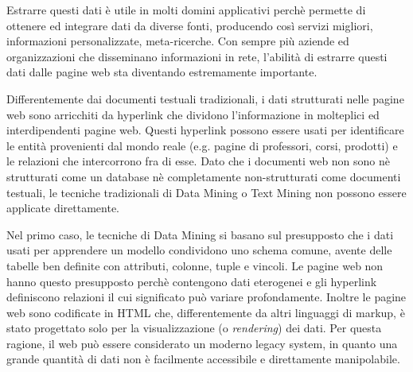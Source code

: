 Estrarre questi dati è utile in molti domini applicativi perchè permette di ottenere ed integrare dati da diverse fonti, producendo così servizi migliori, informazioni personalizzate, meta-ricerche. Con sempre più aziende ed organizzazioni che disseminano informazioni in rete, l’abilità di estrarre questi dati dalle pagine web sta diventando estremamente importante.


Differentemente dai documenti testuali tradizionali, i dati strutturati nelle pagine web sono arricchiti da hyperlink che dividono l’informazione in molteplici ed interdipendenti pagine web. Questi hyperlink possono essere usati per identificare le entità provenienti dal mondo reale (e.g. pagine di professori, corsi, prodotti) e le relazioni che intercorrono fra di esse. Dato che i documenti web non sono nè strutturati come un database nè completamente non-strutturati come documenti testuali, le tecniche tradizionali di Data Mining o Text Mining non possono essere applicate direttamente. 


Nel primo caso, le tecniche di Data Mining si basano sul presupposto che i dati usati per apprendere un modello condividono uno schema comune, avente delle tabelle ben definite con attributi, colonne, tuple e vincoli. Le pagine web non hanno questo presupposto perchè contengono dati eterogenei e gli hyperlink definiscono relazioni il cui significato può variare profondamente. Inoltre le pagine web sono codificate in HTML che, differentemente da altri linguaggi di markup, è stato progettato solo per la visualizzazione (o \textit{rendering}) dei dati. Per questa ragione, il web può essere considerato un moderno legacy system, in quanto una grande quantità di dati non è facilmente accessibile e  direttamente manipolabile. 


